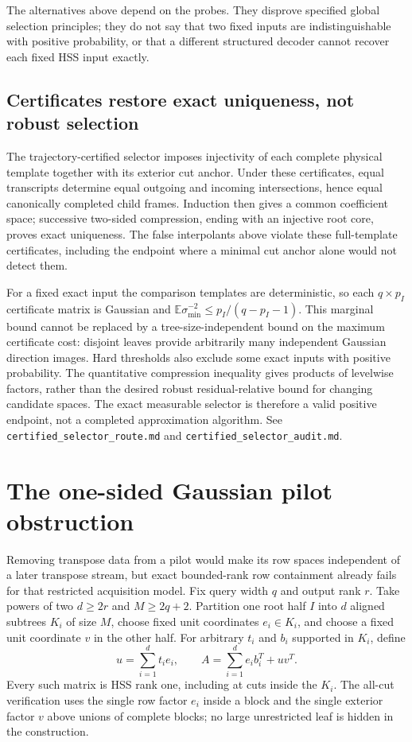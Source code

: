 \documentclass[11pt,oneside,openany,a4paper]{report}
\numberwithin{equation}{chapter}
\theoremstyle{definition}
\theoremstyle{remark}
\newcommand{\sourcefile}[1]{{\small\nolinkurl{#1}}}
\begin{document}
The alternatives above depend on the probes.  They disprove specified
global selection principles; they do not say that two fixed inputs are
indistinguishable with positive probability, or that a different
structured decoder cannot recover each fixed HSS input exactly.

\subsection{Certificates restore exact uniqueness, not robust selection}

The trajectory-certified selector imposes injectivity of each complete
physical template together with its exterior cut anchor.  Under these
certificates, equal transcripts determine equal outgoing and incoming
intersections, hence equal canonically completed child frames.  Induction
then gives a common coefficient space; successive two-sided compression,
ending with an injective root core, proves exact uniqueness.  The false
interpolants above violate these full-template certificates, including
the endpoint where a minimal cut anchor alone would not detect them.

For a fixed exact input the comparison templates are deterministic, so
each $q\times p_I$ certificate matrix is Gaussian and
$\mathbb E\sigma_{\min}^{-2}\le p_I/(q-p_I-1)$.  This marginal
bound cannot be replaced by a tree-size-independent bound on the
maximum certificate cost: disjoint leaves provide arbitrarily many
independent Gaussian direction images.  Hard thresholds also exclude
some exact inputs with positive probability.  The quantitative
compression inequality gives products of levelwise factors, rather
than the desired robust residual-relative bound for changing candidate
spaces.  The exact measurable selector is therefore a valid positive
endpoint, not a completed approximation algorithm.
See \sourcefile{certified_selector_route.md} and
\sourcefile{certified_selector_audit.md}.

\section{The one-sided Gaussian pilot obstruction}

Removing transpose data from a pilot would make its row spaces
independent of a later transpose stream, but exact bounded-rank row
containment already fails for that restricted acquisition model.
Fix query width $q$ and output rank $r$.  Take powers of two
$d\ge2r$ and $M\ge2q+2$.  Partition one root half $I$ into $d$ aligned
subtrees $K_i$ of size $M$, choose fixed unit coordinates $e_i\in K_i$,
and choose a fixed unit coordinate $v$ in the other half.  For arbitrary
$t_i$ and $b_i$ supported in $K_i$, define
\[
 u=\sum_{i=1}^d t_i e_i,
 \qquad A=\sum_{i=1}^d e_i b_i^T+uv^T.
\]
Every such matrix is HSS rank one, including at cuts inside the $K_i$.
The all-cut verification uses the single row factor $e_i$ inside a
block and the single exterior factor $v$ above unions of complete
blocks; no large unrestricted leaf is hidden in the construction.
\end{document}
